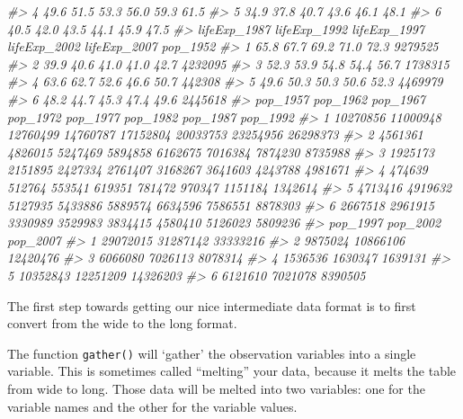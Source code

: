 \documentclass[
]{book}
\newenvironment{Shaded}{\begin{snugshade}}{\end{snugshade}}
\newcommand{\CommentTok}[1]{\textcolor[rgb]{0.56,0.35,0.01}{\textit{#1}}}
\begin{document}
\begin{Shaded}
\begin{Highlighting}[]
\CommentTok{#> 4         49.6         51.5         53.3         56.0         59.3         61.5}
\CommentTok{#> 5         34.9         37.8         40.7         43.6         46.1         48.1}
\CommentTok{#> 6         40.5         42.0         43.5         44.1         45.9         47.5}
\CommentTok{#>   lifeExp_1987 lifeExp_1992 lifeExp_1997 lifeExp_2002 lifeExp_2007 pop_1952}
\CommentTok{#> 1         65.8         67.7         69.2         71.0         72.3  9279525}
\CommentTok{#> 2         39.9         40.6         41.0         41.0         42.7  4232095}
\CommentTok{#> 3         52.3         53.9         54.8         54.4         56.7  1738315}
\CommentTok{#> 4         63.6         62.7         52.6         46.6         50.7   442308}
\CommentTok{#> 5         49.6         50.3         50.3         50.6         52.3  4469979}
\CommentTok{#> 6         48.2         44.7         45.3         47.4         49.6  2445618}
\CommentTok{#>   pop_1957 pop_1962 pop_1967 pop_1972 pop_1977 pop_1982 pop_1987 pop_1992}
\CommentTok{#> 1 10270856 11000948 12760499 14760787 17152804 20033753 23254956 26298373}
\CommentTok{#> 2  4561361  4826015  5247469  5894858  6162675  7016384  7874230  8735988}
\CommentTok{#> 3  1925173  2151895  2427334  2761407  3168267  3641603  4243788  4981671}
\CommentTok{#> 4   474639   512764   553541   619351   781472   970347  1151184  1342614}
\CommentTok{#> 5  4713416  4919632  5127935  5433886  5889574  6634596  7586551  8878303}
\CommentTok{#> 6  2667518  2961915  3330989  3529983  3834415  4580410  5126023  5809236}
\CommentTok{#>   pop_1997 pop_2002 pop_2007}
\CommentTok{#> 1 29072015 31287142 33333216}
\CommentTok{#> 2  9875024 10866106 12420476}
\CommentTok{#> 3  6066080  7026113  8078314}
\CommentTok{#> 4  1536536  1630347  1639131}
\CommentTok{#> 5 10352843 12251209 14326203}
\CommentTok{#> 6  6121610  7021078  8390505}
\end{Highlighting}
\end{Shaded}

The first step towards getting our nice intermediate data format is to first convert from the wide to the long format.

The function \texttt{gather()} will `gather' the observation variables into a single variable. This is sometimes called ``melting'' your data, because it melts the table from wide to long. Those data will be melted into two variables: one for the variable names and the other for the variable values.
\end{document}
